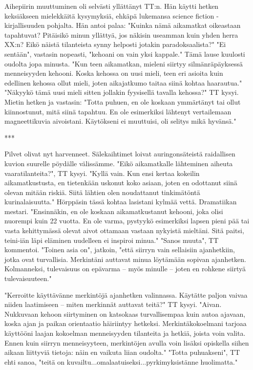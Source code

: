 ﻿\documentclass[a4paper, 12pt, finnish]{article}
\begin{document}
Aihepiirin muuttuminen oli selvästi yllättänyt TT:n.
Hän käytti hetken keksiäkseen mielekkäitä kysymyksiä, ehkäpä
lukemansa science fiction -kirjallisuuden pohjalta. Hän antoi palaa: 
"Kuinka nämä aikamatkat oikeastaan tapahtuvat? Pitäisikö minun yllättyä, jos
näkisin useamman kuin yhden herra XX:n? Eikö näistä tilanteista synny
helposti jotakin paradoksaalista?"
"Ei sentään", vastasin nopeasti, "kehoani on vain yksi kappale."
Tämä lause kuulosti oudolta jopa minusta.
"Kun teen aikamatkan,
mieleni siirtyy silmänräpäyksessä menneisyyden kehooni. Koska kehossa on
uusi mieli, teen eri asioita kuin edellinen kehossa ollut mieli,
joten aikajatkumo taitaa siinä kohtaa haarautua."
"Näkyykö tämä uusi mieli sitten jollakin fyysisellä tavalla kehossa?" TT kysyi.
Mietin hetken ja vastasin: "Totta puhuen, en ole koskaan ymmärtänyt
tai ollut kiinnostunut, mitä siinä tapahtuu. En ole esimerkiksi
lähtenyt vertailemaan magneettikuvia aivoistani. Käytökseni ei
muuttuisi, oli selitys mikä hyvänsä."

***

Pilvet olivat nyt harvenneet. Sälekaihtimet loivat auringonsäteistä
raidallisen kuvion suurelle pöydälle välissämme.
"Eikö aikamatkalle lähteminen aiheuta vaaratilanteita?", TT kysyi.
"Kyllä vain. Kun ensi kertaa kokeilin aikamatkustusta, en tietenkään uskonut
koko asiaan, joten en odottanut siinä olevan mitään riskiä. Siitä lähtien
olen noudattanut tinkimätöntä kurinalaisuutta."
Hörppäsin tässä kohtaa lasistani kylmää vettä. Dramatiikan mestari.
"Ensinnäkin, en ole koskaan
aikamatkustanut kehooni, joka olisi nuorempi kuin 22 vuotta.
En ole varma, pystyykö esimerkiksi lapsen pieni pää tai
vasta kehittymässä olevat aivot ottamaan vastaan nykyistä mieltäni.
Sitä paitsi, teini-iän läpi eläminen uudelleen ei inspiroi minua."
"Sanos muuta", TT kommentoi.
"Toinen asia on", jatkoin, "että siirryn vain sellaisiin
ajanhetkiin, jotka ovat turvallisia. Merkintäni auttavat minua
löytämään sopivan ajanhetken. Kolmanneksi, tulevaisuus on
epävarma -- myös minulle -- joten
en rohkene siirtyä tulevaisuuteen." 

"Kerroitte käyttävänne merkintöjä ajanhetken valinnassa.
Käytätte paljon vaivaa niiden laatimiseen -- miten merkinnät
auttavat teitä?" TT kysyi.
"Aivan. Nukkuvaan kehoon siirtyminen
on katsokaas turvallisempaa kuin autoa ajavaan, koska ajan ja paikan
orientaatio häiriintyy hetkeksi. Merkintäkokoelmani tarjoaa
käyttööni laajan kokoelman menneisyyden tilanteita
ja hetkiä, joista voin valita.
Ennen kuin siirryn menneisyyteen, merkintöjen avulla voin lisäksi opiskella
siihen aikaan liittyviä tietoja: näin en vaikuta liian oudolta."
"Totta puhuakseni", TT ehti sanoa, "teitä on
kuvailtu...omalaatuiseksi...pyrkimyksistänne huolimatta."
\end{document}
